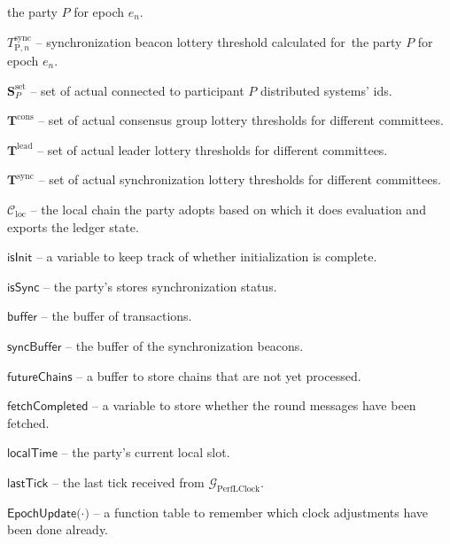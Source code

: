 \begin{legal}
    the party $P$ for epoch $e_n$.
    \item[\ding{113}] $T^{\text{sync}}_{\text{P}, n}$ -- synchronization beacon lottery threshold calculated for\
    the party $P$ for epoch $e_n$.
    \item[\ding{113}] $\mathbf{S}_P^{\text{set}}$ -- set of actual connected to participant $P$ distributed systems' ids.
    \item[\ding{113}] $\mathbf{T}^{\text{cons}}$ -- set of actual consensus group lottery thresholds for different committees.
    \item[\ding{113}] $\mathbf{T}^{\text{lead}}$ -- set of actual leader lottery thresholds for different committees.
    \item[\ding{113}] $\mathbf{T}^{\text{sync}}$ -- set of actual synchronization lottery thresholds for different committees.
    \item[\ding{113}] $\mathcal{C}_{\text{loc}}$ -- the local chain the party adopts based on which it does evaluation and
    exports the ledger state.
    \item[\ding{113}] $\textsf{isInit}$ -- a variable to keep track of whether initialization is complete.
    \item[\ding{113}] $\textsf{isSync}$ -- the party's stores synchronization status.
    \item[\ding{113}] $\textsf{buffer}$ -- the buffer of transactions.
    \item[\ding{113}] $\textsf{syncBuffer}$ -- the buffer of the synchronization beacons.
    \item[\ding{113}] $\textsf{futureChains}$ -- a buﬀer to store chains that are not yet processed.
    \item[\ding{113}] $\textsf{fetchCompleted}$ -- a variable to store whether the round messages have been fetched.
    \item[\ding{113}] $\textsf{localTime}$ -- the party's current local slot.
    \item[\ding{113}] $\textsf{lastTick}$ -- the last tick received from $\mathcal{G}_{\text{PerfLClock}}$.
    \item[\ding{113}] $\textsf{EpochUpdate(·)}$ -- a function table to remember which clock adjustments have been done already.

\end{legal}
